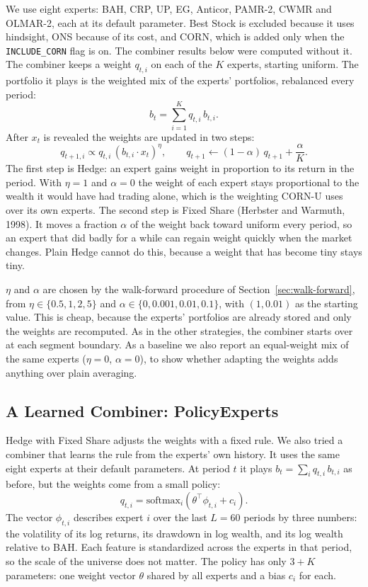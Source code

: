 \documentclass[11pt]{article}
\begin{document}
We use eight experts: BAH, CRP, UP, EG, Anticor, PAMR-2, CWMR and OLMAR-2,
each at its default parameter. Best Stock is excluded because it uses
hindsight, ONS because of its cost, and CORN, which is added only when the
\texttt{INCLUDE\_CORN} flag is on. The combiner results below were computed
without it. The combiner keeps a weight $q_{t,i}$ on each of the $K$ experts, starting
uniform. The portfolio it plays is the weighted mix of the experts'
portfolios, rebalanced every period:
\[
    b_t = \sum_{i=1}^{K} q_{t,i}\, b_{t,i}.
\]
After $x_t$ is revealed the weights are updated in two steps:
\[
    q_{t+1,i} \propto q_{t,i}\,(b_{t,i} \cdot x_t)^{\eta}, \qquad
    q_{t+1} \leftarrow (1-\alpha)\, q_{t+1} + \frac{\alpha}{K}.
\]
The first step is Hedge: an expert gains weight in proportion to its
return in the period. With $\eta=1$ and $\alpha=0$ the weight of each
expert stays proportional to the wealth it would have had trading alone,
which is the weighting CORN-U uses over its own experts. The second step
is Fixed Share (Herbster and Warmuth, 1998). It moves a fraction $\alpha$
of the weight back toward uniform every period, so an expert that did
badly for a while can regain weight quickly when the market changes. Plain
Hedge cannot do this, because a weight that has become tiny stays tiny.

$\eta$ and $\alpha$ are chosen by the walk-forward procedure of
Section~\ref{sec:walk-forward}, from $\eta \in \{0.5, 1, 2, 5\}$ and
$\alpha \in \{0, 0.001, 0.01, 0.1\}$, with $(1, 0.01)$ as the starting
value. This is cheap, because the experts' portfolios are already stored
and only the weights are recomputed. As in the other strategies, the
combiner starts over at each segment boundary. As a baseline we also
report an equal-weight mix of the same experts ($\eta=0$, $\alpha=0$), to
show whether adapting the weights adds anything over plain averaging.

\subsection{A Learned Combiner: PolicyExperts}
\label{sec:policy}

Hedge with Fixed Share adjusts the weights with a fixed rule. We also
tried a combiner that learns the rule from the experts' own history. It
uses the same eight experts at their default parameters. At period $t$ it
plays $b_t = \sum_i q_{t,i}\, b_{t,i}$ as before, but the weights come from
a small policy:
\[
    q_{t,i} = \mathrm{softmax}_i\!\left(\theta^\top \phi_{t,i} + c_i\right).
\]
The vector $\phi_{t,i}$ describes expert $i$ over the last $L=60$ periods
by three numbers: the volatility of its log returns, its drawdown in log
wealth, and its log wealth relative to BAH. Each feature is standardized
across the experts in that period, so the scale of the universe does not
matter. The policy has only $3+K$ parameters: one weight vector $\theta$
shared by all experts and a bias $c_i$ for each.
\end{document}
